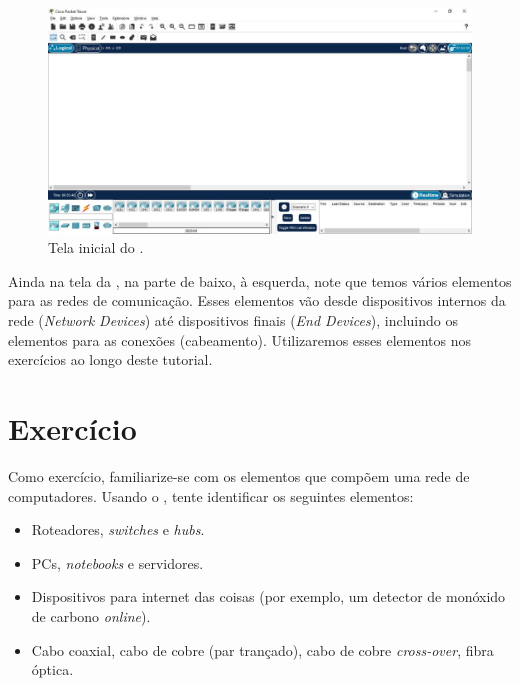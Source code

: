 \begin{figure}[!htb]
    \centering
    \includegraphics[width=.99\textwidth]{Figuras/TelaInicial}
    \caption{Tela inicial do \CPT.}    \label{fig:telaInicial}
\end{figure}

Ainda na tela da , na parte de baixo, à esquerda, note que temos vários elementos para as redes de comunicação. Esses elementos vão desde dispositivos internos da rede (\textit{Network Devices}) até dispositivos finais (\textit{End Devices}), incluindo os elementos para as conexões (cabeamento). Utilizaremos esses elementos nos exercícios ao longo deste tutorial.

\section{Exercício}
Como exercício, familiarize-se com os elementos que compõem uma rede de computadores. Usando o \CPT, tente identificar os seguintes elementos:
\begin{itemize}
    \item Roteadores, \textit{switches} e \textit{hubs}.
    \item PCs, \textit{notebooks} e servidores.
    \item Dispositivos para internet das coisas (por exemplo, um detector de monóxido de carbono \textit{online}).
    \item Cabo coaxial, cabo de cobre (par trançado), cabo de cobre \textit{cross-over}, fibra óptica.
\end{itemize}